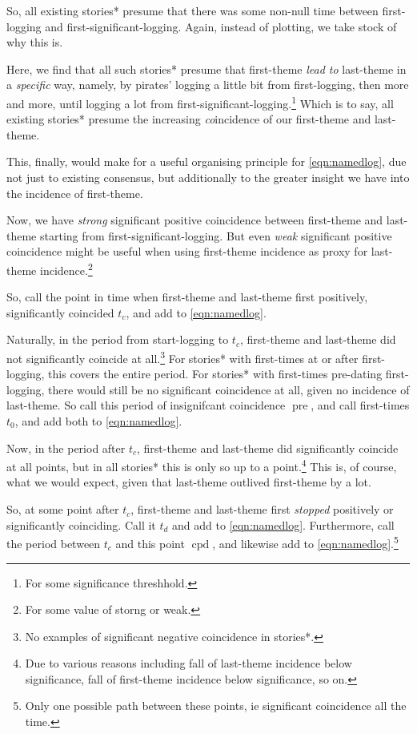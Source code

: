\documentclass{amsart}
\DeclareMathOperator{\pre}{pre} %
\DeclareMathOperator{\cpd}{cpd} %
\theoremstyle{definition}
\theoremstyle{remark}
\begin{document}
			So, all existing stories* presume that there was some non-null time between first-logging and first-significant-logging. Again, instead of plotting, we take stock of why this is.
			
			Here, we find that all such stories* presume that first-theme \emph{lead to} last-theme in a \emph{specific} way, namely, by pirates' logging a little bit from first-logging, then more and more, until logging a lot from first-significant-logging.\footnote{For some significance threshhold.} Which is to say, all existing stories* presume the increasing \emph{co}incidence of our first-theme and last-theme.
			
			This, finally, would make for a useful organising principle for \ref{eqn:namedlog}, due not just to existing consensus, but additionally to the greater insight we have into the incidence of first-theme.
			
			Now, we have \emph{strong} significant positive coincidence between first-theme and last-theme starting from first-significant-logging. But even \emph{weak} significant positive coincidence might be useful when using first-theme incidence as proxy for last-theme incidence.\footnote{For some value of storng or weak.}
			
			So, call the point in time when first-theme and last-theme first positively, significantly coincided \(t_c\), and add to \ref{eqn:namedlog}.
			
			Naturally, in the period from start-logging to \(t_c\), first-theme and last-theme did not significantly coincide at all.\footnote{No examples of significant negative coincidence in stories*.} For stories* with first-times at or after first-logging, this covers the entire period. For stories* with first-times pre-dating first-logging, there would still be no significant coincidence at all, given no incidence of last-theme. So call this period of insignifcant coincidence \(\pre\), and call first-times \(t_0\), and add both to \ref{eqn:namedlog}.
			
			Now, in the period after \(t_c\), first-theme and last-theme did significantly coincide at all points, but in all stories* this is only so up to a point.\footnote{Due to various reasons including fall of last-theme incidence below significance, fall of first-theme incidence below significance, so on.} This is, of course, what we would expect, given that last-theme outlived first-theme by a lot.
			
			So, at some point after \(t_c\), first-theme and last-theme first \emph{stopped} positively or significantly coinciding. Call it \(t_d\) and add to \ref{eqn:namedlog}. Furthermore, call the period between \(t_c\) and this point \(\cpd\), and likewise add to \ref{eqn:namedlog}.\footnote{Only one possible path between these points, ie significant coincidence all the time.}
			
\end{document}
